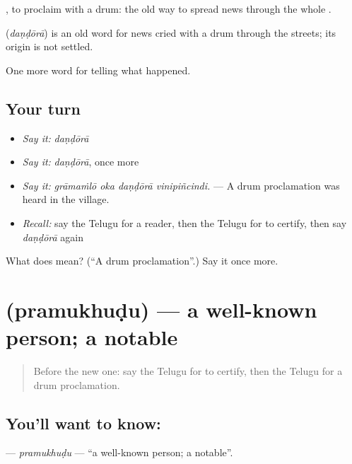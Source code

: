  , to proclaim with a drum: the old way to spread news through the whole .

\begin{cousinweb}
\textbf{} (\emph{daṇḍōrā}) is an old word for news cried with a drum through the streets; its origin is not settled.
\end{cousinweb}

\begin{grammarlens}[title={What you've built}]
One more word for telling what happened.
\end{grammarlens}

\subsection*{Your turn}
\begin{itemize}
\raggedright
  \item \emph{Say it:} \emph{daṇḍōrā}
  \item \emph{Say it:} \emph{daṇḍōrā}, once more
  \item \emph{Say it:} \emph{grāmaṁlō oka daṇḍōrā vinipiñcindi.} — A drum proclamation was heard in the village.
  \item \emph{Recall:} say the Telugu for a reader, then the Telugu for to certify, then say \emph{daṇḍōrā} again
\end{itemize}

\begin{tcolorbox}[breakable,colback=teal!4,colframe=teal!35!black,title={Before you move on}]
What does  mean? (\textquotedblleft{}A drum proclamation\textquotedblright{}.) Say it once more.
\end{tcolorbox}
\section[\texorpdfstring{\te{ప్రముఖుడు} (pramukhuḍu)}{ప్రముఖుడు (pramukhuḍu)}]{ (pramukhuḍu) — a well-known person; a notable}

\label{lesson:TE-C342-pramukhudu}



\begin{quote}
Before the new one: say the Telugu for to certify, then the Telugu for a drum proclamation.
\end{quote}

\subsection*{You'll want to know: }
\textbf{} — \emph{pramukhuḍu} — \textquotedblleft{}a well-known person; a notable\textquotedblright{}.

